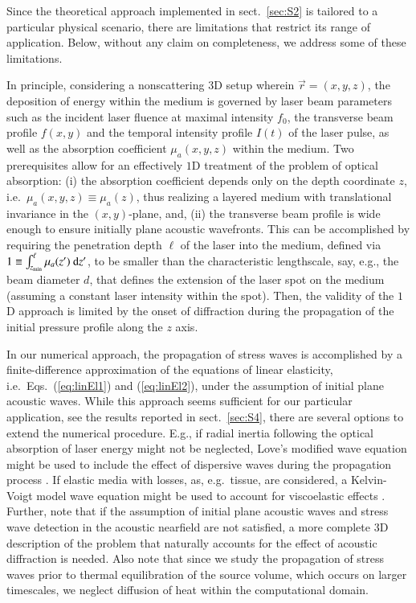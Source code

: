 \documentclass[5p,times,twocolumn]{elsarticle}
\begin{document}
Since the theoretical approach implemented in sect.\ \ref{sec:S2} is tailored
to a particular physical scenario, there are limitations that restrict its
range of application. Below, without any claim on completeness, we address some 
of these limitations.

In principle, considering a nonscattering $3$D setup wherein $\vec{r}=(x,y,z)$,
the deposition of energy within the medium is governed by laser beam parameters
such as the incident laser fluence at maximal intensity $f_0$, the transverse
beam profile $f(x,y)$ and the temporal intensity profile $I(t)$ of the laser
pulse, as well as the absorption coefficient $\mu_a(x,y,z)$ within the medium.
Two prerequisites allow for an effectively $1$D
treatment of the problem of optical absorption: (i) the absorption coefficient
depends only on the depth coordinate $z$, i.e.\ $\mu_a(x,y,z)\equiv \mu_a(z)$,
thus realizing a layered medium with translational invariance in the
$(x,y)$-plane, and, (ii) the transverse beam profile is wide enough to ensure 
initially plane acoustic wavefronts.  
This can be accomplished by requiring the penetration depth $\ell$ of the laser
into the medium, defined via $1\equiv \int_{z_{\rm{min}}}^{\ell}
\mu_a(z^\prime)~\mathrm{d}z^\prime$, to be smaller than the characteristic
lengthscale, say, e.g., the beam diameter $d$, that defines the extension of the
laser spot on the medium (assuming a constant laser intensity within the spot).
Then, the validity of the $1$D approach is limited by the onset of diffraction 
during the propagation of the initial pressure profile along the $z$ axis.

In our numerical approach, the propagation of stress waves is accomplished by a
finite-difference approximation of the equations of linear elasticity, i.e.\
Eqs.\ (\ref{eq:linEl1}) and (\ref{eq:linEl2}), under the assumption of initial
plane acoustic waves. While this approach seems sufficient for our particular
application, see the results reported in sect.\ \ref{sec:S4}, there are several
options to extend the numerical procedure.  E.g., if radial inertia following
the optical absorption of laser energy might not be neglected, Love's modified
wave equation might be used to include the effect of dispersive waves during
the propagation process \cite{Percival:1969}.  If elastic media with losses,
as, e.g.\ tissue, are considered, a Kelvin-Voigt model wave equation might be
used to account for viscoelastic effects \cite{Szabo:2004}.  Further, note that
if the assumption of initial plane acoustic waves and stress wave detection in
the acoustic nearfield are not satisfied, a more complete $3$D description of
the problem that naturally accounts for the effect of acoustic diffraction is
needed.  Also note that since we study the propagation of stress waves prior to
thermal equilibration of the source volume, which occurs on larger timescales,
we neglect diffusion of heat within the computational domain. 
\end{document}
